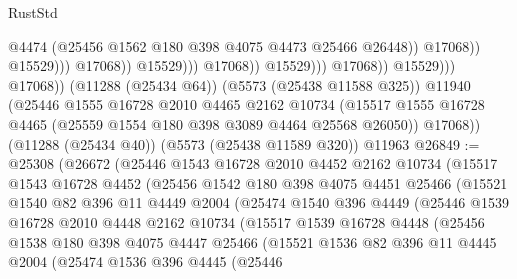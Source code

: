 \begin{lexlean}{RustStd}
\begin{coremodule}
                                                    @4474
                                                    (@25456
                                                      @1562
                                                      @180
                                                      @398
                                                      @4075
                                                      @4473
                                                      @25466
                                                      @26448))
                                                  @17068))
                                              @15529)))
                                        @17068))
                                    @15529)))
                              @17068))
                          @15529)))
                    @17068))
                @15529)))
          @17068))
      (@11288 (@25434 @64))
      (@5573 (@25438 @11588 @325))
      @11940
      (@25446
        @1555
        @16728
        @2010
        @4465
        @2162
        @10734
        (@15517 @1555 @16728 @4465 (@25559 @1554 @180 @398 @3089 @4464 @25568 @26050))
        @17068))
    (@11288 (@25434 @40))
    (@5573 (@25438 @11589 @320))
    @11963
@26849 := @25308
    (@26672
      (@25446
        @1543
        @16728
        @2010
        @4452
        @2162
        @10734
        (@15517
          @1543
          @16728
          @4452
          (@25456
            @1542
            @180
            @398
            @4075
            @4451
            @25466
            (@15521
              @1540
              @82
              @396
              @11
              @4449
              @2004
              (@25474
                @1540
                @396
                @4449
                (@25446
                  @1539
                  @16728
                  @2010
                  @4448
                  @2162
                  @10734
                  (@15517
                    @1539
                    @16728
                    @4448
                    (@25456
                      @1538
                      @180
                      @398
                      @4075
                      @4447
                      @25466
                      (@15521
                        @1536
                        @82
                        @396
                        @11
                        @4445
                        @2004
                        (@25474
                          @1536
                          @396
                          @4445
                          (@25446

\end{coremodule}
\end{lexlean}
